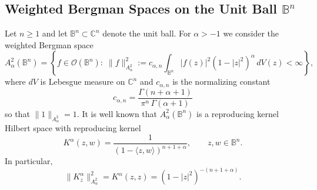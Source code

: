 \documentclass{amsart}
\theoremstyle{definition}
\theoremstyle{remark}
\numberwithin{equation}{section}
\begin{document}

\subsection{Weighted Bergman Spaces on the Unit Ball $\mathbb{B}^n$}

Let $n\ge 1$ and let $\mathbb{B}^n\subset\mathbb{C}^n$ denote the unit ball.  
For $\alpha>-1$ we consider the weighted Bergman space
\[
A^2_\alpha(\mathbb{B}^n)
=
\left\{
f\in\mathcal{O}(\mathbb{B}^n):
\;
\|f\|^2_{A^2_\alpha}
:=
c_{\alpha,n}
\int_{\mathbb{B}^n} |f(z)|^2 (1-|z|^2)^\alpha\, dV(z)
<\infty
\right\},
\]
where $dV$ is Lebesgue measure on $\mathbb{C}^n$ and
$c_{\alpha,n}$ is the normalizing constant
\[
c_{\alpha,n}
=
\frac{\Gamma(n+\alpha+1)}{\pi^n\,\Gamma(\alpha+1)}
\]
so that $\|1\|_{A^2_\alpha}=1$.
It is well known that $A^2_\alpha(\mathbb{B}^n)$ is a reproducing kernel Hilbert space with reproducing kernel
\begin{equation}
K^\alpha(z,w)
=
\frac{1}{(1-\langle z,w\rangle)^{n+1+\alpha}},
\qquad z,w\in\mathbb{B}^n.
\label{eq:ball-kernel}
\end{equation}
In particular,
\[
\|K^\alpha_z\|^2_{A^2_\alpha}
=
K^\alpha(z,z)
=
(1-|z|^2)^{-(n+1+\alpha)}.
\]
\end{document}
